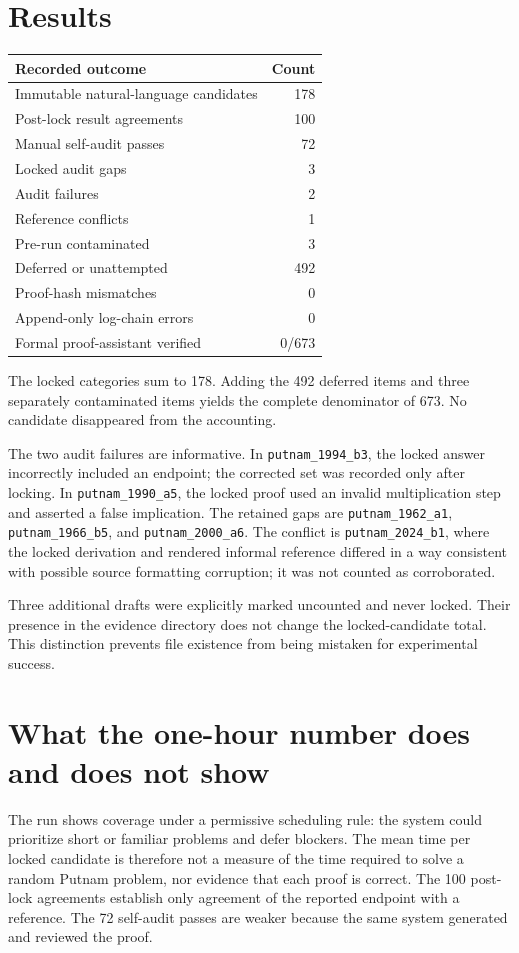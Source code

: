 \documentclass[10pt]{article}
\newcommand{\status}[1]{\texttt{#1}}
\begin{document}
\section{Results}
\begin{center}\small
\begin{tabular}{lr}
\toprule
Recorded outcome & Count\\\midrule
Immutable natural-language candidates & 178\\
Post-lock result agreements & 100\\
Manual self-audit passes & 72\\
Locked audit gaps & 3\\
Audit failures & 2\\
Reference conflicts & 1\\
Pre-run contaminated & 3\\
Deferred or unattempted & 492\\
Proof-hash mismatches & 0\\
Append-only log-chain errors & 0\\
Formal proof-assistant verified & 0/673\\
\bottomrule
\end{tabular}
\end{center}

The locked categories sum to 178. Adding the 492 deferred items and three separately contaminated items yields the complete denominator of 673. No candidate disappeared from the accounting.

The two audit failures are informative. In \status{putnam\_1994\_b3}, the locked answer incorrectly included an endpoint; the corrected set was recorded only after locking. In \status{putnam\_1990\_a5}, the locked proof used an invalid multiplication step and asserted a false implication. The retained gaps are \status{putnam\_1962\_a1}, \status{putnam\_1966\_b5}, and \status{putnam\_2000\_a6}. The conflict is \status{putnam\_2024\_b1}, where the locked derivation and rendered informal reference differed in a way consistent with possible source formatting corruption; it was not counted as corroborated.

Three additional drafts were explicitly marked uncounted and never locked. Their presence in the evidence directory does not change the locked-candidate total. This distinction prevents file existence from being mistaken for experimental success.

\section{What the one-hour number does and does not show}
The run shows coverage under a permissive scheduling rule: the system could prioritize short or familiar problems and defer blockers. The mean time per locked candidate is therefore not a measure of the time required to solve a random Putnam problem, nor evidence that each proof is correct. The 100 post-lock agreements establish only agreement of the reported endpoint with a reference. The 72 self-audit passes are weaker because the same system generated and reviewed the proof.
\end{document}
